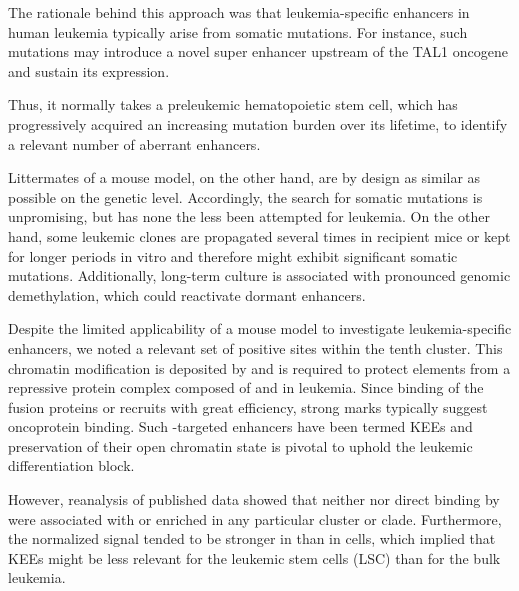 The rationale behind this approach was that leukemia-specific enhancers in human leukemia typically arise from somatic mutations. For instance, such mutations may introduce a novel super enhancer upstream of the TAL1 oncogene and sustain its expression\cite{Mansour2014,Vahedi2015}. 

Thus, it normally takes a preleukemic hematopoietic stem cell, which has progressively acquired an increasing mutation burden over its lifetime, to identify a relevant number of aberrant enhancers\cite{Corces2016}. 

Littermates of a mouse model, on the other hand, are by design as similar as possible on the genetic level. Accordingly, the search for somatic mutations is unpromising, but has none the less been attempted for \mllafnine leukemia\cite{George2016}. On the other hand, some leukemic clones are propagated several times in recipient mice or kept for longer periods in vitro and therefore might exhibit significant somatic mutations. Additionally, long-term culture is associated with pronounced genomic demethylation\cite{Ziller2013}, which could reactivate dormant enhancers\cite{Aran2013,Aran2014}.        

Despite the limited applicability of a mouse model to investigate leukemia-specific enhancers, we noted a relevant set of \hisseventyninetwo positive sites within the tenth cluster. This chromatin modification is deposited by  and is required to protect elements from a repressive protein complex composed of  and  in leukemia\cite{Chen2015}. Since binding of the fusion proteins \mllaffour or \mllafnine recruits  with great efficiency\cite{Kuntimaddi2015}, strong \hisseventyninetwo marks typically suggest oncoprotein binding\cite{Prange2017}. Such -targeted enhancers have been termed  KEEs\cite{Godfrey2019} and preservation of their open chromatin state is pivotal to uphold the leukemic differentiation block\cite{Cusan2018}.  

However, reanalysis of published data\cite{Bernt2011} showed that neither \hisseventyninetwo nor direct binding by \mllafnine {} were associated with or enriched in any particular cluster or clade. Furthermore, the normalized \hisseventyninetwo signal tended to be stronger in \kitlow than in \kithi cells, which implied that KEEs might be less relevant for the leukemic stem cells (LSC) than for the bulk leukemia.

